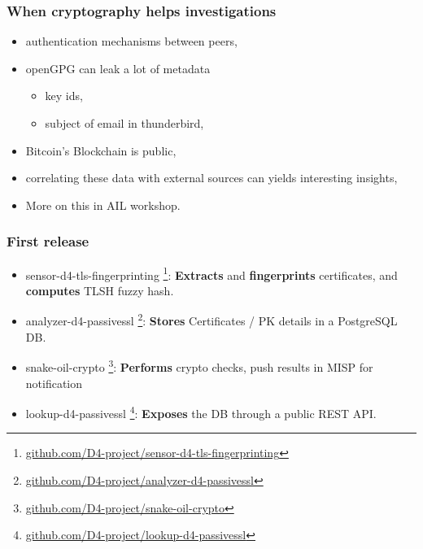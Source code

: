 \documentclass{beamer}
\begin{document}
\begin{frame}
        \frametitle{When cryptography helps investigations}
        \begin{itemize}
         \item authentication mechanisms between peers,
         \item openGPG can leak a lot of metadata
        \begin{itemize}
          \item key ids,
          \item subject of email in thunderbird,
        \end{itemize}
          \item Bitcoin's Blockchain is public,
          \item correlating these data with external sources can yields
            interesting insights,
          \item More on this in AIL workshop.
        \end{itemize}

\end{frame}














\begin{frame}
  \frametitle{First release}
  \begin{itemize}
  \item[\checkmark] sensor-d4-tls-fingerprinting
    \footnote{\url{github.com/D4-project/sensor-d4-tls-fingerprinting}}:
    {\bf Extracts} and {\bf fingerprints} certificates, and {\bf computes} TLSH fuzzy hash.
  \item[\checkmark] analyzer-d4-passivessl
    \footnote{\url{github.com/D4-project/analyzer-d4-passivessl}}:
    {\bf Stores} Certificates / PK details in a PostgreSQL DB.
  \item snake-oil-crypto 
    \footnote{\url{github.com/D4-project/snake-oil-crypto}}:
    {\bf Performs} crypto checks, push results in MISP for notification
  \item lookup-d4-passivessl
    \footnote{\url{github.com/D4-project/lookup-d4-passivessl}}:
    {\bf Exposes} the DB through a public REST API.
  \end{itemize} 
\end{frame}
\end{document}
